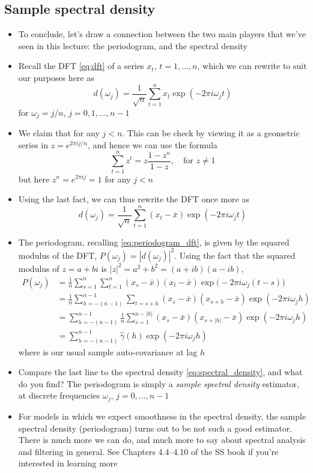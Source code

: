 \documentclass{article}
\begin{document}
\subsection{Sample spectral density}

\begin{itemize}
\item To conclude, let's draw a connection between the two main players that
  we've seen in this lecture: the periodogram, and the spectral density 

\item Recall the DFT \eqref{eq:dft} of a series $x_t$, $t = 1,\dots,n$, which we
  can rewrite to suit our purposes here as
  \[
  d(\omega_j) = \frac{1}{\sqrt{n}} \sum_{t=1}^n x_t \exp(-2\pi i \omega_j t) 
  \]
  for $\omega_j = j/n$, $j = 0,1,\dots,n-1$

\item We claim that 
  for any $j < n$. This can be check by viewing it as a geometric series
   in $z = e^{2\pi i j / n}$, and hence we can use the
  formula  
  \[
  \sum_{t=1}^n z^t = z \frac{1-z^n}{1-z}, \quad \text{for $z \not= 1$}
  \] 
  but here $z^n = e^{2\pi i j} = 1$ for any $j < n$

\item Using the last fact, we can thus rewrite the DFT once more as  
  \[
  d(\omega_j) = \frac{1}{\sqrt{n}} \sum_{t=1}^n (x_t - \bar{x}) \exp(-2\pi i
  \omega_j t)
  \]

\item The periodogram, recalling \eqref{eq:periodogram_dft}, is given by the 
  squared modulus of the DFT, $P(\omega_j) = |d(\omega_j)|^2$. Using the fact
  that the squared modulus of $z = a+bi$ is $|z|^2 = a^2 + b^2 = (a+ib)(a-ib)$,  
  \begin{align*}
  P(\omega_j) &= \frac{1}{n} \sum_{s=1}^n \sum_{t=1}^n (x_s - \bar{x}) (x_t -
    \bar{x}) \exp\big( -2\pi i \omega_j (t-s) \big) \\
  &= \frac{1}{n} \sum_{h=-(n-1)}^{n-1} \sum_{t = s+h} (x_s - \bar{x}) (x_{s+h} -
    \bar{x}) \exp(-2\pi i \omega_j h) \\
  &= \sum_{h=-(n-1)}^{n-1} \frac{1}{n} \sum_{s=1}^{n-|h|} (x_s - \bar{x})
    (x_{s+|h|} - \bar{x}) \exp(-2\pi i \omega_j h) \\
  &= \sum_{h=-(n-1)}^{n-1} \hat\gamma(h) \exp(-2\pi i \omega_j h)
  \end{align*}
  where  is our usual sample auto-covariance at lag $h$ 

\item Compare the last line to the spectral density \eqref{eq:spectral_density},
  and what do you find? The periodogram is simply a \emph{sample spectral
    density} estimator, at discrete frequencies $\omega_j$, $j = 0,\dots,n-1$ 

\item For models in which we expect smoothness in the spectral density, the
  sample spectral density (periodogram) turns out to be not such a good
  estimator. There is much more we can do, and much more to say about spectral
  analysis and filtering in general. See Chapters 4.4--4.10 of the SS book if
  you're interested in learning more
\end{itemize}
\end{document}
